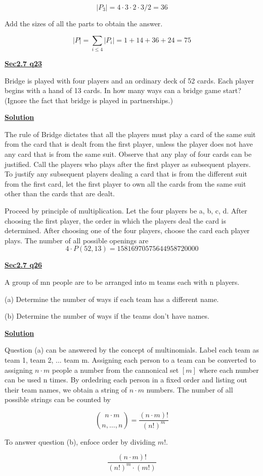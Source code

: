\documentclass{article}
\newcommand{\new}[1]{
    \vspace{2mm}
    \noindent
    \textbf{
    \underline{#1}}
}
\newcommand{\m}{
    \cdot
}
\begin{document}
\[
    |P_3| = 4\m3\m2\m3 /2 = 36
\]

Add the sizes of all the parts to obtain the answer.

\[
    |P| = \sum_{i\leq 4} |P_i| = 1 + 14 + 36 + 24 = \boxed{75}
\]


\new{Sec2.7 q23}
Bridge is played with four players and an ordinary deck of 52 cards. Each player 
begins with a hand of 13 cards. In how many ways can a bridge game start? 
(Ignore the fact that bridge is played in partnerships.) 

\new{Solution}
The rule of Bridge dictates that all the players must play 
a card of the same suit from the card that is dealt from the first player, 
unless the player does not have any card that is from the same suit. 
Observe that any play of four cards can be justified. Call the players 
who plays after the first player as subsequent players. To justify any 
subsequent players dealing a card that is from the different suit from 
the first card, let the first player to own all the cards from the same 
suit other than the cards that are dealt. 

Proceed by principle of multiplication. 
Let the four players be a, b, c, d. After choosing the first player, 
the order in which the players deal the card is determined. After 
choosing one of the four players, choose the card each player plays. 
The number of all possible openings are
\[
    4\m P(52, 13) = \boxed{15816970575644958720000}
\]

\new{Sec2.7 q26}
A group of mn people are to be arranged into m teams each with n players. 

(a) Determine the number of ways if each team has a different name. 

(b) Determine the number of ways if the teams don't have names. 


\new{Solution}
Question (a) can be answered by the concept of multinomials. Label each 
team as team 1, team 2, ... team m. Assigning each person to a team 
can be converted to assigning $n\m m$ people a number from the 
cannonical set $[m]$ where each number can be used n times. By ordedring 
each person in a fixed order and listing out their team names, we obtain 
a string of $n\m m$ numbers. The number of all possible strings can be counted by

\[
    \binom{n\m m}{n, \dots, n} = \boxed{\frac{(n\m m)!}{(n!)^m}}
\]

To answer question (b), enfoce order by dividing $m!$.

\[
    \boxed{\frac{(n\m m)!}{(n!)^m\m(m!)}}
\]
\end{document}
